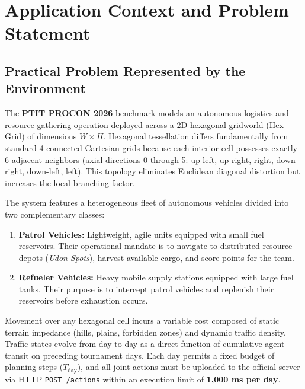 \documentclass[11pt,a4paper]{article}
\begin{document}
\section{Application Context and Problem Statement}

\subsection{Practical Problem Represented by the Environment}
The \textbf{PTIT PROCON 2026} benchmark models an autonomous logistics and resource-gathering operation deployed across a 2D hexagonal gridworld (Hex Grid) of dimensions $W \times H$. Hexagonal tessellation differs fundamentally from standard 4-connected Cartesian grids because each interior cell possesses exactly 6 adjacent neighbors (axial directions 0 through 5: up-left, up-right, right, down-right, down-left, left). This topology eliminates Euclidean diagonal distortion but increases the local branching factor.

The system features a heterogeneous fleet of autonomous vehicles divided into two complementary classes:
\begin{enumerate}
    \item \textbf{Patrol Vehicles:} Lightweight, agile units equipped with small fuel reservoirs. Their operational mandate is to navigate to distributed resource depots (\textit{Udon Spots}), harvest available cargo, and score points for the team.
    \item \textbf{Refueler Vehicles:} Heavy mobile supply stations equipped with large fuel tanks. Their purpose is to intercept patrol vehicles and replenish their reservoirs before exhaustion occurs.
\end{enumerate}

Movement over any hexagonal cell incurs a variable cost composed of static terrain impedance (hills, plains, forbidden zones) and dynamic traffic density. Traffic states evolve from day to day as a direct function of cumulative agent transit on preceding tournament days. Each day permits a fixed budget of planning steps ($T_{\text{day}}$), and all joint actions must be uploaded to the official server via HTTP \texttt{POST /actions} within an execution limit of \textbf{1,000 ms per day}.
\end{document}
